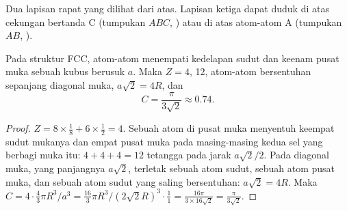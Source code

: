 \begin{omfigure}

{\small Dua lapisan rapat yang dilihat dari atas. Lapisan ketiga dapat
duduk di atas cekungan bertanda C (tumpukan $ABC$, )
atau di atas atom-atom A (tumpukan $AB$, ).}
\end{omfigure}

\begin{proposition}\label{prop:b1:crystals-metals:fcc}
Pada struktur FCC, atom-atom menempati kedelapan sudut dan keenam pusat
muka sebuah kubus berusuk $a$. Maka $Z = 4$,  12,
atom-atom bersentuhan sepanjang diagonal muka, $a\sqrt2 = 4R$, dan
\[
  C = \frac{\pi}{3\sqrt2} \approx 0.74 .
\]
\end{proposition}

\begin{proof}
$Z = 8 \times \frac18 + 6 \times \frac12 = 4$. Sebuah atom di pusat muka
menyentuh keempat sudut mukanya dan empat pusat muka pada masing-masing
kedua sel yang berbagi muka itu: $4 + 4 + 4 = 12$ tetangga pada jarak
$a\sqrt2/2$. Pada diagonal muka, yang panjangnya $a\sqrt2$, terletak
sebuah atom sudut, sebuah atom pusat muka, dan sebuah atom sudut yang
saling bersentuhan: $a\sqrt2 = 4R$. Maka
$C = 4 \cdot \frac43\pi R^3/a^3 = \frac{16}{3}\pi R^3/(2\sqrt2 R)^3 \cdot
\frac{1}{1} = \frac{16\pi}{3 \times 16\sqrt2} = \frac{\pi}{3\sqrt2}$.
\end{proof}


